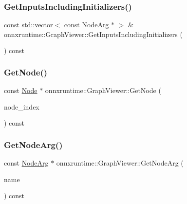 \subsubsection{\texorpdfstring{Get\+Inputs\+Including\+Initializers()}{GetInputsIncludingInitializers()}}
{\footnotesize\ttfamily const std\+::vector$<$ const \mbox{\hyperlink{classonnxruntime_1_1NodeArg}{Node\+Arg}} $\ast$ $>$ \& onnxruntime\+::\+Graph\+Viewer\+::\+Get\+Inputs\+Including\+Initializers (\begin{DoxyParamCaption}{ }\end{DoxyParamCaption}) const\hspace{0.3cm}{\ttfamily [noexcept]}}

\mbox{\label{classonnxruntime_1_1GraphViewer_a28c2a2c0c9ef24a4b62ef2de888d849b}} 
\subsubsection{\texorpdfstring{Get\+Node()}{GetNode()}}
{\footnotesize\ttfamily const \mbox{\hyperlink{classonnxruntime_1_1Node}{Node}} $\ast$ onnxruntime\+::\+Graph\+Viewer\+::\+Get\+Node (\begin{DoxyParamCaption}\item[{\mbox{\hyperlink{namespaceonnxruntime_af8773b5c12b5d8fd9292eb2e268df760}{Node\+Index}}}]{node\+\_\+index }\end{DoxyParamCaption}) const}

\mbox{\label{classonnxruntime_1_1GraphViewer_aec62375d2610b79f37bf00cd8895ec1c}} 
\subsubsection{\texorpdfstring{Get\+Node\+Arg()}{GetNodeArg()}}
{\footnotesize\ttfamily const \mbox{\hyperlink{classonnxruntime_1_1NodeArg}{Node\+Arg}} $\ast$ onnxruntime\+::\+Graph\+Viewer\+::\+Get\+Node\+Arg (\begin{DoxyParamCaption}\item[{const std\+::string \&}]{name }\end{DoxyParamCaption}) const}

